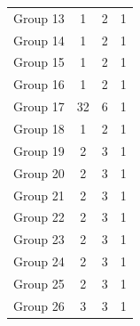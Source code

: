 \begin{table}[t]
\begin{tabular}{@{}rccc@{}}
        Group 13 & 1                                         & 2                                          & 1                                      \\
        Group 14 & 1                                         & 2                                          & 1                                      \\
        Group 15 & 1                                         & 2                                          & 1                                      \\
        Group 16 & 1                                         & 2                                          & 1                                      \\
        Group 17 & 32                                        & 6                                          & 1                                      \\
        Group 18 & 1                                         & 2                                          & 1                                      \\
        Group 19 & 2                                         & 3                                          & 1                                      \\
        Group 20 & 2                                         & 3                                          & 1                                      \\
        Group 21 & 2                                         & 3                                          & 1                                      \\
        Group 22 & 2                                         & 3                                          & 1                                      \\
        Group 23 & 2                                         & 3                                          & 1                                      \\
        Group 24 & 2                                         & 3                                          & 1                                      \\
        Group 25 & 2                                         & 3                                          & 1                                      \\
        Group 26 & 3                                         & 3                                          & 1                                      \\

\end{tabular}
\end{table}
